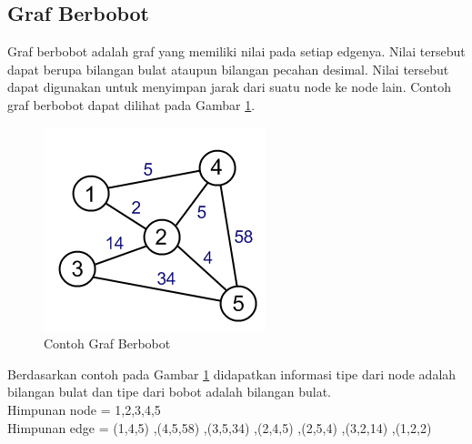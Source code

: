 \subsection{Graf Berbobot}
Graf berbobot adalah graf yang memiliki nilai pada setiap edgenya. Nilai
tersebut dapat berupa bilangan bulat ataupun bilangan pecahan desimal. Nilai
tersebut dapat digunakan untuk menyimpan jarak dari suatu node ke node lain.
Contoh graf berbobot dapat dilihat pada Gambar \ref{fig:weight_graph}.
\begin{figure}[h]
\centering
\includegraphics[scale=0.8]{Gambar/weight_graph}
\caption[Contoh Graf Berbobot]{Contoh Graf Berbobot}
\label{fig:weight_graph}
\end{figure}
Berdasarkan contoh pada Gambar \ref{fig:weight_graph}  didapatkan informasi tipe
dari node adalah bilangan bulat dan tipe dari bobot adalah bilangan bulat. \\
Himpunan node = {1,2,3,4,5} \\ 
Himpunan edge = {(1,4,5) ,(4,5,58) ,(3,5,34) ,(2,4,5) ,(2,5,4) ,(3,2,14) ,(1,2,2)} 

